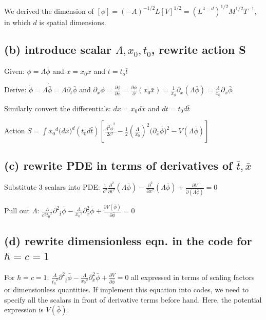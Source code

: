 \documentclass{article}
\begin{document}
\vspace{3mm}
We derived the dimension of 
$[\phi]=(-A)^{-1/2}L[V]^{1/2}=(L^{4-d})^{1/2}M^{1/2}T^{-1}$, in which $d$ is spatial dimensions.

\subsection{(b) introduce scalar $\Lambda, x_0, t_0$, rewrite action S}

Given: $\phi=\Lambda{\bar{\phi}}$ and $x=x_0{\bar{x}}$ and $t=t_o{\bar{t}}$

\vspace{3mm}
Derive: $\dot{\phi}=\Lambda{\dot{\bar\phi}}=\Lambda{\partial_t}{\bar\phi}$ and $\partial_x{\phi}=\frac{\partial\phi}{\partial{x}}=\frac{\partial\phi}{\partial}{{(x_0\bar{x})}}=\frac{1}{x_0}{\partial_\bar{x}}{(\Lambda{\bar\phi})}=\frac{\Lambda}{x_0}{\partial_\bar{x}}{\bar\phi}$

\vspace{3mm}
Similarly convert the differentials: $dx=x_0{d\bar{x}}$ and $dt=t_0{d\bar{t}}$

\vspace{3mm}
Action $S=\int{{x_0}^d{(d\bar{x}})^d{(t_0{d\bar{t}})}[\frac{\Lambda^2{\dot{\bar{\phi}}}^2}{2c^2}-\frac{1}{2}{(\frac{\Lambda}{x_0})^2(\partial_{\bar{x}}{\bar\phi}})^2-V(\Lambda\bar\phi)]}$

\subsection{(c) rewrite PDE in terms of  derivatives of $\bar{t}, \bar{x}$}
Substitute 3 scalars into PDE: $\frac{1}{c^2}{\frac{\partial^2}{\partial{t^2}}(\Lambda\bar\phi)}-\frac{\partial^2}{\partial{x^2}}(\Lambda\bar\phi)+\frac{\partial{V}}{\partial(\Lambda\bar\phi)}=0$

\vspace{3mm}
Pull out $\Lambda$: $\frac{\Lambda}{{c^2}{t_0}^2}{{\partial^2}_{\bar{t}}\bar\phi}-{\frac{\Lambda}{{x_0}^2}{\partial^2_{\bar{x}}}}{\bar\phi}+{\frac{\partial{V(\bar\phi)}}{\partial{\bar\phi}}}=0$


\subsection{(d) rewrite dimensionless eqn. in the code for  $\hbar=c=1$}
For $\hbar=c=1$: 
$\frac{\Lambda}{{t_0}^2}{{\partial^2}_{\bar{t}}\bar\phi}-{\frac{\Lambda}{{x_0}^2}{\partial^2_{\bar{x}}}}{\bar\phi}+{\frac{\partial{V}}{\partial{\bar\phi}}}=0$ all expressed in terms of scaling factors or dimensionless quantities. If implement this equation into codes, we need to specify all the scalars in front of derivative terms before hand. Here, the potential expression is $V(\bar\phi)$.
\end{document}

